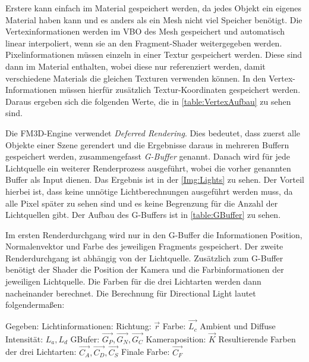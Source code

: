 Erstere kann einfach im Material gespeichert werden, da jedes Objekt ein eigenes Material haben kann und es anders als ein Mesh nicht viel Speicher benötigt. Die Vertexinformationen werden im \ac{VBO} des Mesh gespeichert und automatisch linear interpoliert, wenn sie an den Fragment-Shader weitergegeben werden. Pixelinformationen müssen einzeln in einer Textur gespeichert werden. Diese sind dann im Material enthalten, wobei diese nur referenziert werden, damit verschiedene Materials die gleichen Texturen verwenden können. In den Vertex-Informationen müssen hierfür zusätzlich Textur-Koordinaten gespeichert werden. Daraus ergeben sich die folgenden Werte, die in \cref{table:VertexAufbau} zu sehen sind.

Die FM3D-Engine verwendet \textit{Deferred Rendering}. Dies bedeutet, dass zuerst alle Objekte einer Szene gerendert und die Ergebnisse daraus in mehreren Buffern gespeichert werden, zusammengefasst \textit{G-Buffer} genannt. Danach wird für jede Lichtquelle ein weiterer Renderprozess ausgeführt, wobei die vorher genannten Buffer als Input dienen. Das Ergebnis ist in der \cref{Img:Lights} zu sehen. Der Vorteil hierbei ist, dass keine unnötige Lichtberechnungen ausgeführt werden muss, da alle Pixel später zu sehen sind und es keine Begrenzung für die Anzahl der Lichtquellen gibt. Der Aufbau des G-Buffers ist in \cref{table:GBuffer} zu sehen.

Im ersten Renderdurchgang wird nur in den G-Buffer die Informationen Position, Normalenvektor und Farbe des jeweiligen Fragments gespeichert. Der zweite Renderdurchgang ist abhängig von der Lichtquelle. Zusätzlich zum G-Buffer benötigt der Shader die Position der Kamera und die Farbinformationen der jeweiligen Lichtquelle. Die Farben für die drei Lichtarten werden dann nacheinander berechnet. Die Berechnung für Directional Light lautet folgendermaßen: 

Gegeben: \newline
	Lichtinformationen: Richtung: $\overrightarrow{r}$ Farbe: $\overrightarrow{L_{c}}$ Ambient und Diffuse Intensität: $L_{a}, L_{d}$ \newline
	GBufer: $\overrightarrow{G_{P}}, \overrightarrow{G_{N}}, \overrightarrow{G_{C}}$ \newline
	Kameraposition: $\overrightarrow{K}$ \newline
	Resultierende Farben der drei Lichtarten: $\overrightarrow{C_{A}},\overrightarrow{C_{D}},\overrightarrow{C_{S}}$\newline 
	Finale Farbe:  $\overrightarrow{C_{F}}$
	
